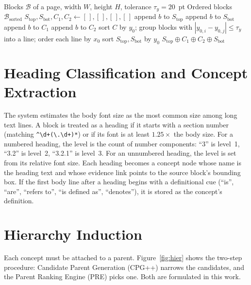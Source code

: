\documentclass[12pt,a4paper,twoside,openright]{report}
\begin{document}
\begin{algorithm}[!htbp]
\caption{Column-Aware 2D Reading-Order Sorting}
\label{alg:reading}
\begin{algorithmic}[1]
\REQUIRE Blocks $\mathcal{B}$ of a page, width $W$, height $H$, tolerance $\tau_y=20$~pt
\ENSURE Ordered blocks $\mathcal{B}_{\text{sorted}}$
\STATE $S_{\text{top}},S_{\text{bot}},C_1,C_2 \leftarrow [\,],[\,],[\,],[\,]$
   \STATE append $b$ to $S_{\text{top}}$
   \STATE append $b$ to $S_{\text{bot}}$
   \STATE append $b$ to $C_1$
  \ELSE \STATE append $b$ to $C_2$ \ENDIF
\ENDFOR
{}
  \STATE sort $C$ by $y_0$; group blocks with $|y_{0,i}-y_{0,j}|\le\tau_y$ into a line; order each line by $x_0$
\ENDFOR
\STATE sort $S_{\text{top}},S_{\text{bot}}$ by $y_0$
\RETURN $S_{\text{top}} \oplus C_1 \oplus C_2 \oplus S_{\text{bot}}$
\end{algorithmic}
\end{algorithm}

\section{Heading Classification and Concept Extraction}
The system estimates the body font size as the most common size among long text lines.
A block is treated as a heading if it starts with a section number (matching
\texttt{\^{}\textbackslash d+(\textbackslash.\textbackslash d+)*}) or if its font is at
least $1.25\times$ the body size. For a numbered heading, the level is the count of
number components: ``3'' is level~1, ``3.2'' is level~2, ``3.2.1'' is level~3. For an
unnumbered heading, the level is set from its relative font size. Each heading becomes a
concept node whose name is the heading text and whose evidence link points to the source
block's bounding box. If the first body line after a heading begins with a definitional
cue (``is'', ``are'', ``refers to'', ``is defined as'', ``denotes''), it is stored as
the concept's definition.

\section{Hierarchy Induction}
Each concept must be attached to a parent. Figure~\ref{fig:hier} shows the two-step
procedure: Candidate Parent Generation (CPG++) narrows the candidates, and the Parent
Ranking Engine (PRE) picks one. Both are formulated in this work.
\end{document}
